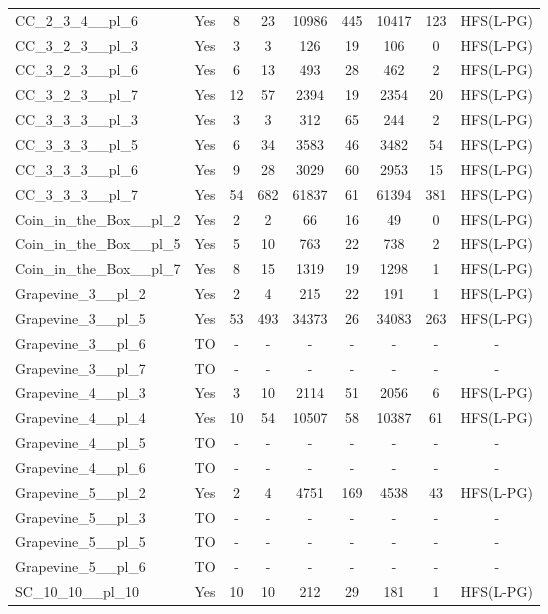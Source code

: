 \documentclass{article}
\begin{document}
\begin{tabular}{lcccccccc}
CC\_2\_3\_4\_\_pl\_6 & Yes & 8 & 23 & 10986 & 445 & 10417 & 123 & HFS(L-PG) \\
CC\_3\_2\_3\_\_pl\_3 & Yes & 3 & 3 & 126 & 19 & 106 & 0 & HFS(L-PG) \\
CC\_3\_2\_3\_\_pl\_6 & Yes & 6 & 13 & 493 & 28 & 462 & 2 & HFS(L-PG) \\
CC\_3\_2\_3\_\_pl\_7 & Yes & 12 & 57 & 2394 & 19 & 2354 & 20 & HFS(L-PG) \\
CC\_3\_3\_3\_\_pl\_3 & Yes & 3 & 3 & 312 & 65 & 244 & 2 & HFS(L-PG) \\
CC\_3\_3\_3\_\_pl\_5 & Yes & 6 & 34 & 3583 & 46 & 3482 & 54 & HFS(L-PG) \\
CC\_3\_3\_3\_\_pl\_6 & Yes & 9 & 28 & 3029 & 60 & 2953 & 15 & HFS(L-PG) \\
CC\_3\_3\_3\_\_pl\_7 & Yes & 54 & 682 & 61837 & 61 & 61394 & 381 & HFS(L-PG) \\
Coin\_in\_the\_Box\_\_pl\_2 & Yes & 2 & 2 & 66 & 16 & 49 & 0 & HFS(L-PG) \\
Coin\_in\_the\_Box\_\_pl\_5 & Yes & 5 & 10 & 763 & 22 & 738 & 2 & HFS(L-PG) \\
Coin\_in\_the\_Box\_\_pl\_7 & Yes & 8 & 15 & 1319 & 19 & 1298 & 1 & HFS(L-PG) \\
Grapevine\_3\_\_pl\_2 & Yes & 2 & 4 & 215 & 22 & 191 & 1 & HFS(L-PG) \\
Grapevine\_3\_\_pl\_5 & Yes & 53 & 493 & 34373 & 26 & 34083 & 263 & HFS(L-PG) \\
Grapevine\_3\_\_pl\_6 & TO & - & - & - & - & - & - & - \\
Grapevine\_3\_\_pl\_7 & TO & - & - & - & - & - & - & - \\
Grapevine\_4\_\_pl\_3 & Yes & 3 & 10 & 2114 & 51 & 2056 & 6 & HFS(L-PG) \\
Grapevine\_4\_\_pl\_4 & Yes & 10 & 54 & 10507 & 58 & 10387 & 61 & HFS(L-PG) \\
Grapevine\_4\_\_pl\_5 & TO & - & - & - & - & - & - & - \\
Grapevine\_4\_\_pl\_6 & TO & - & - & - & - & - & - & - \\
Grapevine\_5\_\_pl\_2 & Yes & 2 & 4 & 4751 & 169 & 4538 & 43 & HFS(L-PG) \\
Grapevine\_5\_\_pl\_3 & TO & - & - & - & - & - & - & - \\
Grapevine\_5\_\_pl\_5 & TO & - & - & - & - & - & - & - \\
Grapevine\_5\_\_pl\_6 & TO & - & - & - & - & - & - & - \\
SC\_10\_10\_\_pl\_10 & Yes & 10 & 10 & 212 & 29 & 181 & 1 & HFS(L-PG) \\

\end{tabular}
\end{document}
